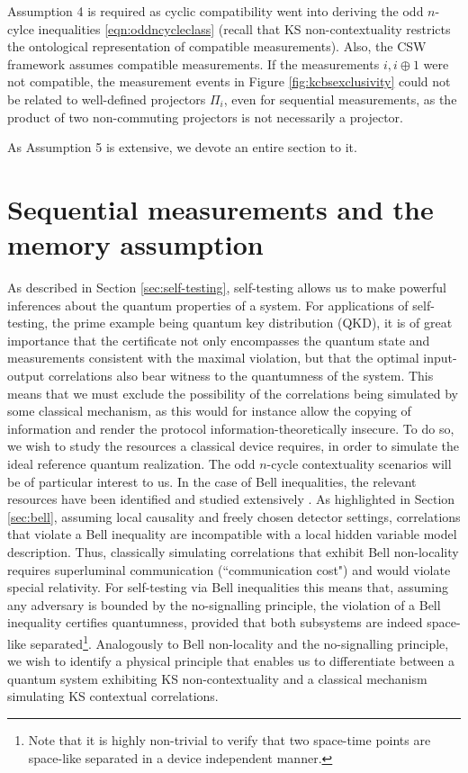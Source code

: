 Assumption 4 is required as cyclic compatibility went into deriving the odd $n$-cylce inequalities \ref{eqn:oddncycleclass} (recall that KS non-contextuality restricts the ontological representation of compatible measurements). Also, the CSW framework assumes compatible measurements. If the measurements $i,i\oplus 1$ were not compatible, the measurement events in Figure \ref{fig:kcbsexclusivity} could not be related to well-defined projectors $\Pi_i$, even for sequential measurements, as the product of two non-commuting projectors is not necessarily a projector.

As Assumption 5 is extensive, we devote an entire section to it. 

\section{Sequential measurements and the memory assumption}
\label{sec:memoryass}
As described in Section \ref{sec:self-testing}, self-testing allows us to make powerful inferences about the quantum properties of a system. For applications of self-testing, the prime example being quantum key distribution (QKD), it is of great importance that the certificate not only encompasses the quantum state and measurements consistent with the maximal violation, but that the optimal input-output correlations also bear witness to the quantumness of the system. This means that we must exclude the possibility of the correlations being simulated by some classical mechanism, as this would for instance allow the copying of information and render the protocol information-theoretically insecure. To do so, we wish to study the resources a classical device requires, in order to simulate the ideal reference quantum realization. The odd $n$-cycle contextuality scenarios will be of particular interest to us. 
In the case of Bell inequalities, the relevant resources have been identified and studied extensively \cite{Brassard1999,Toner2003}. As highlighted in Section \ref{sec:bell}, assuming local causality and freely chosen detector settings, correlations that violate a Bell inequality are incompatible with a local hidden variable model description. Thus, classically simulating correlations that exhibit Bell non-locality requires superluminal communication (``communication cost") \cite{Toner2003} and would violate special relativity. For self-testing via Bell inequalities this means that, assuming any adversary is bounded by the no-signalling principle, the violation of a Bell inequality certifies quantumness, provided that both subsystems are indeed space-like separated\footnote{Note that it is highly non-trivial to verify that two space-time points are space-like separated in a device independent manner.}. Analogously to Bell non-locality and the no-signalling principle, we wish to identify a physical principle that enables us to differentiate between a quantum system exhibiting KS non-contextuality and a classical mechanism simulating KS contextual correlations.
